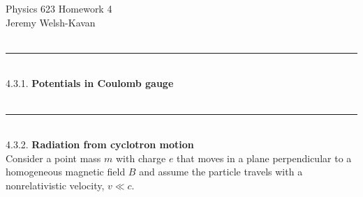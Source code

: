 \documentclass[]{article}
\begin{document}
{\Large Physics 623 Homework 4}\\
{Jeremy Welsh-Kavan}\\
\hfill \\ 
\noindent\rule{15cm}{0.4pt} \\

4.3.1. {\bf Potentials in Coulomb gauge } \\




\hfill \\ 
\noindent\rule{15cm}{0.4pt} \\

4.3.2. {\bf Radiation from cyclotron motion } \\

Consider a point mass $m$ with charge $e$ that moves in a plane perpendicular to a homogeneous magnetic field $B$ and assume the particle travels with a nonrelativistic velocity, $v \ll c$. \\
\end{document}
